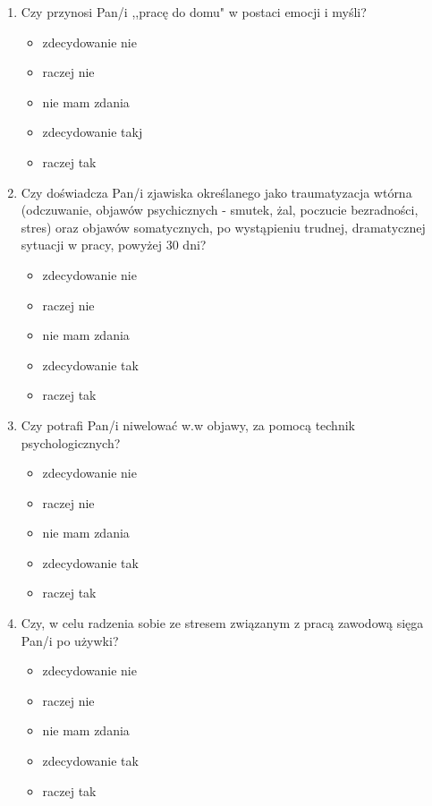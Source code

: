 \documentclass[a4paper,12pt,twoside,openright]{mwrep}
\begin{document}
\begin{enumerate}[label=\arabic*)]
		
		\item{Czy przynosi Pan/i ,,pracę do domu" w postaci emocji i myśli?}
		\begin{itemize}
			\item{zdecydowanie nie}
			\item{raczej nie}
			\item{nie mam zdania}
			\item{zdecydowanie takj}
			\item{raczej tak}
		\end{itemize}
		\vspace{\baselineskip}
		
		\item{ Czy doświadcza Pan/i zjawiska określanego jako traumatyzacja wtórna (odczuwanie, objawów psychicznych - smutek, żal, poczucie bezradności, stres) oraz objawów somatycznych, po wystąpieniu trudnej, dramatycznej sytuacji w pracy, powyżej 30 dni?}
		\begin{itemize}
		\item{zdecydowanie nie}
			\item{raczej nie}
			\item{nie mam zdania}
			\item{zdecydowanie tak}
			\item{raczej tak}
		\end{itemize}
		\vspace{\baselineskip} 
		
			\item{Czy potrafi Pan/i niwelować w.w objawy, za pomocą technik psychologicznych?}
		\begin{itemize}
			\item{zdecydowanie nie}
			\item{raczej nie}
			\item{nie mam zdania}
			\item{zdecydowanie tak}
			\item{raczej tak}
		\end{itemize}
		\vspace{\baselineskip}
		
			\item{Czy, w celu radzenia sobie ze stresem związanym z pracą zawodową sięga Pan/i po używki?}
		\begin{itemize}
			\item{zdecydowanie nie}
			\item{raczej nie}
			\item{nie mam zdania}
			\item{zdecydowanie tak}
			\item{raczej tak}
		\end{itemize}
		\vspace{\baselineskip}
		

\end{enumerate}
\end{document}
